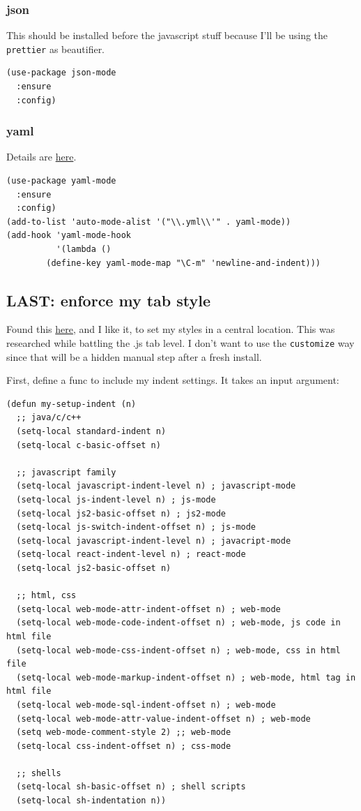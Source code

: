 \documentclass[11pt]{article}
\begin{document}
\subsubsection{json}
\label{sec:org026a42d}

This should be installed before the javascript stuff because I'll be
using the \texttt{prettier} as beautifier.

\begin{verbatim}
(use-package json-mode
  :ensure
  :config)
\end{verbatim}
\subsubsection{yaml}
\label{sec:org9c4dd88}

Details are \href{https://github.com/yoshiki/yaml-mode}{here}.

\begin{verbatim}
(use-package yaml-mode
  :ensure
  :config)
(add-to-list 'auto-mode-alist '("\\.yml\\'" . yaml-mode))
(add-hook 'yaml-mode-hook
          '(lambda ()
        (define-key yaml-mode-map "\C-m" 'newline-and-indent)))
\end{verbatim}
\subsection{LAST: enforce my tab style}
\label{sec:orgf0adae6}

Found this \href{https://github.com/syl20bnr/spacemacs/issues/5923}{here}, and I like it, to set my styles in a central
location. This was researched while battling the .js tab level. I
don't want to use the \texttt{customize} way since that will be a hidden
manual step after a fresh install.

First, define a func to include my indent settings. It takes an input
argument:

\begin{verbatim}
(defun my-setup-indent (n)
  ;; java/c/c++
  (setq-local standard-indent n)
  (setq-local c-basic-offset n)

  ;; javascript family
  (setq-local javascript-indent-level n) ; javascript-mode
  (setq-local js-indent-level n) ; js-mode
  (setq-local js2-basic-offset n) ; js2-mode
  (setq-local js-switch-indent-offset n) ; js-mode
  (setq-local javascript-indent-level n) ; javacript-mode
  (setq-local react-indent-level n) ; react-mode
  (setq-local js2-basic-offset n)

  ;; html, css
  (setq-local web-mode-attr-indent-offset n) ; web-mode
  (setq-local web-mode-code-indent-offset n) ; web-mode, js code in html file
  (setq-local web-mode-css-indent-offset n) ; web-mode, css in html file
  (setq-local web-mode-markup-indent-offset n) ; web-mode, html tag in html file
  (setq-local web-mode-sql-indent-offset n) ; web-mode
  (setq-local web-mode-attr-value-indent-offset n) ; web-mode
  (setq web-mode-comment-style 2) ;; web-mode
  (setq-local css-indent-offset n) ; css-mode

  ;; shells
  (setq-local sh-basic-offset n) ; shell scripts
  (setq-local sh-indentation n))
\end{verbatim}
\end{document}
